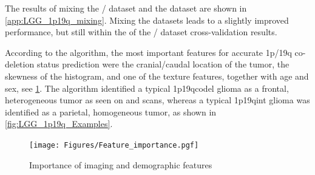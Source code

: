 The results of mixing the / dataset and the  dataset are shown in \cref{app:LGG_1p19q_mixing}.
Mixing the datasets leads to a slightly improved performance, but still within the  of the / dataset cross-validation results.

According to the algorithm, the most important features for accurate 1p/19q co-deletion status prediction were the cranial/caudal location of the \gls{tumor}, the skewness of the   histogram, and one of the texture features, together with age and sex, see \cref{fig:LGG_1p19q_feature_importance}.
The algorithm identified a typical \acl{1p19qcodel} glioma as a frontal, heterogeneous \gls{tumor} as seen on  and  scans, whereas a typical \acl{1p19qint} glioma was identified as a parietal, homogeneous \gls{tumor}, as shown in \cref{fig:LGG_1p19q_Examples}.


\begin{figure}[htbp]
\centering
\texttt{[image: Figures/Feature\_importance.pgf]}
\caption{Importance of imaging and demographic features}\label{fig:LGG_1p19q_feature_importance}
\end{figure}


